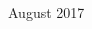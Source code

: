 \begin{titlepage}
\begin{addmargin}[-1cm]{-3cm}
\begin{center}
        \vspace{1cm}

        August 2017

        \vfill



        \vfill

    \end{center}
  \end{addmargin}
\end{titlepage}









